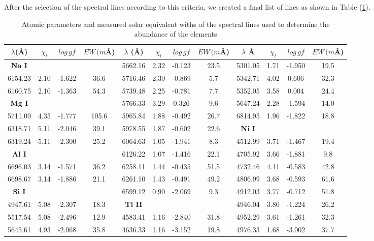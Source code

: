 \documentclass[dvips,12pt,a4paper]{report}
\begin{document}
{{After the selection of the spectral lines according to this criteria, we created a final list of lines as shown in Table (\ref{loggf}). 

\begin{table}[h]\scriptsize
\label {loggf}
  \centering
\caption[Atomic parameters of the spectral lines]{Atomic parameters and measured solar equivalent withs of the spectral lines used to determine the abundance of the elements} 
  \begin{tabular}{c c c c | c c c c | c c c c}
\hline
\hline 
$\lambda$(\AA) & $\chi_l$ & $log\,gf$ & $EW\,(m$\AA{}) &$\lambda\,\ $(\AA{}) & $\chi_l$ & $log\,gf$ & $EW\,(m$\AA{}) &$\lambda\,\ $\AA{} & $\chi_l$ & $log\,gf$ & $EW\,(m$\AA{}) \\
\hline
\textbf{Na I} &  & &  & 5662.16 & 2.32 & -0.123 &  23.5 & 5301.05 & 1.71 & -1.950 &  19.5 \\
6154.23 & 2.10 & -1.622 &  36.6 & 5716.46 & 2.30 & -0.869 &   5.7 & 5342.71 & 4.02 &  0.606 &  32.3 \\
6160.75 & 2.10 & -1.363 &  54.3 & 5739.48 & 2.25 & -0.781 &   7.7 & 5352.05 & 3.58 &  0.004 &  24.4 \\
\textbf{Mg I} &  & &  & 5766.33 & 3.29 &  0.326 &   9.6 & 5647.24 & 2.28 & -1.594 &  14.0 \\
5711.09 & 4.35 & -1.777 & 105.6 & 5965.84 & 1.88 & -0.492 &  26.7 & 6814.95 & 1.96 & -1.822 &  18.8 \\
6318.71 & 5.11 & -2.046 &  39.1 & 5978.55 & 1.87 & -0.602 &  22.6 & \textbf{Ni I} & & &  \\
6319.24 & 5.11 & -2.300 &  25.2 & 6064.63 & 1.05 & -1.941 &   8.3 & 4512.99 & 3.71 & -1.467 &  19.4 \\
\textbf{Al I } &  & &  & 6126.22 & 1.07 & -1.416 &  22.1 & 4705.92 & 3.66 & -1.881 &   9.8 \\
6696.03 & 3.14 & -1.571 &  36.2 & 6258.11 & 1.44 & -0.435 &  51.5 & 4732.46 & 4.11 & -0.583 &  42.8 \\
6698.67 & 3.14 & -1.886 &  21.1 & 6261.10 & 1.43 & -0.491 &  49.2 & 4806.99 & 3.68 & -0.593 &  61.6 \\
\textbf{Si I} &  & & & 6599.12 & 0.90 & -2.069 &   9.3 & 4912.03 & 3.77 & -0.712 &  51.8 \\
4947.61 & 5.08 & -2.307 &  18.3 & \textbf{Ti II} & & & &  4946.04 & 3.80 & -1.224 &  26.2 \\
5517.54 & 5.08 & -2.496 &  12.9 & 4583.41 & 1.16 & -2.840 &  31.8 & 4952.29 & 3.61 & -1.261 &  32.3 \\
5645.61 & 4.93 & -2.068 &  35.8 & 4636.33 & 1.16 & -3.152 &  19.8 & 4976.33 & 1.68 & -3.002 &  37.7 \\

\end{tabular}
\end{table}}}
\end{document}
